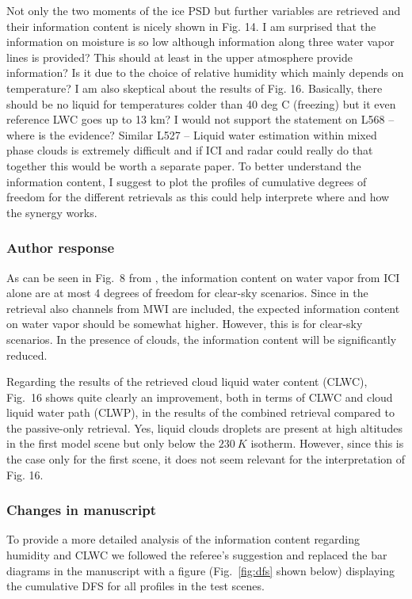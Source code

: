Not only the two moments of the ice PSD but further variables are retrieved and
their information content is nicely shown in Fig. 14. I am surprised that the
information on moisture is so low although information along three water vapor
lines is provided? This should at least in the upper atmosphere provide
information? Is it due to the choice of relative humidity which mainly depends
on temperature? I am also skeptical about the results of Fig. 16. Basically,
there should be no liquid for temperatures colder than 40 deg C (freezing) but
it even reference LWC goes up to 13 km? I would not support the statement on
L568 – where is the evidence? Similar L527 – Liquid water estimation within
mixed phase clouds is extremely difficult and if ICI and radar could really do
that together this would be worth a separate paper. To better understand the
information content, I suggest to plot the profiles of cumulative degrees of
freedom for the different retrievals as this could help interprete where and how
the synergy works.

\subsubsection*{Author response}

As can be seen in Fig.~8 from \cite{eriksson19}, the information content on
water vapor from ICI alone are at most 4 degrees of freedom for clear-sky
scenarios. Since in the retrieval also channels from MWI are included, the
expected information content on water vapor should be somewhat higher. However,
this is for clear-sky scenarios. In the presence of clouds, the information
content will be significantly reduced.

Regarding the results of the retrieved cloud liquid water content (CLWC),
Fig.~16 shows quite clearly an improvement, both in terms of CLWC and cloud
liquid water path (CLWP), in the results of the combined retrieval compared to
the passive-only retrieval. Yes, liquid clouds droplets are present at high
altitudes in the first model scene but only below the $230\ \unit{K}$ isotherm.
However, since this is the case only for the first scene, it does not seem
relevant for the interpretation of Fig. 16.

\subsubsection*{Changes in manuscript}

To provide a more detailed analysis of the information content regarding
humidity and CLWC we followed the referee's suggestion and replaced the bar
diagrams in the manuscript with a figure (Fig.~\ref{fig:dfs} shown below)
displaying the cumulative DFS for all profiles in the test scenes.

